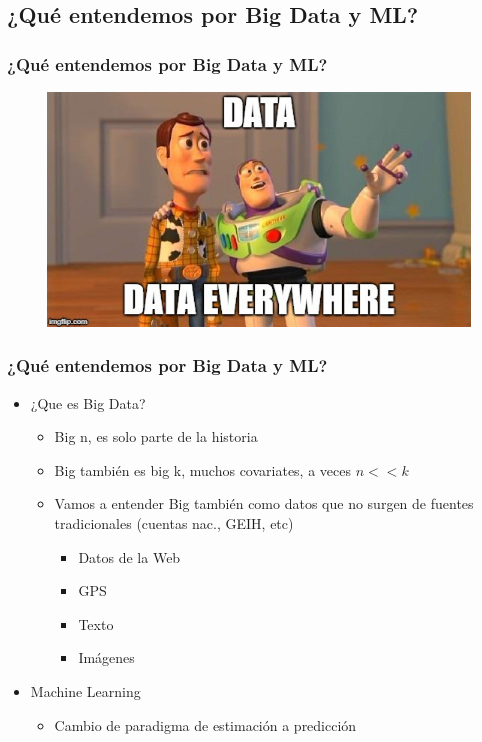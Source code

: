 \documentclass[
  shownotes,
  xcolor={svgnames},
  hyperref={colorlinks,citecolor=DarkBlue,linkcolor=DarkRed,urlcolor=DarkBlue}
  , aspectratio=169]{beamer}
\begin{document}
\subsection{¿Qué entendemos por Big Data y ML?}
\begin{frame}
\frametitle{¿Qué entendemos por Big Data y ML?}

\begin{figure}[H] \centering
  \captionsetup{justification=centering}  
    \includegraphics[scale=0.5]{figures/data_everywhere}
\end{figure}



\end{frame}

\begin{frame}
\frametitle{¿Qué entendemos por Big Data y ML?}

\begin{itemize}
      \item ¿Que es Big Data? 
      \begin{itemize}
      \item Big n, es solo parte de la historia
      \item Big también es big k, muchos covariates, a veces $n<<k$
      \item Vamos a entender Big también como datos que no surgen de fuentes tradicionales (cuentas nac., GEIH, etc)
      \begin{itemize}
        \item Datos de la Web
        \item GPS
        \item Texto
        \item Imágenes
      \end{itemize}
      \end{itemize}
      \medskip
      \item Machine Learning
        \begin{itemize}
          \item Cambio de paradigma de estimación a predicción

        \end{itemize} 
      
\end{itemize}

\end{frame}
\end{document}
